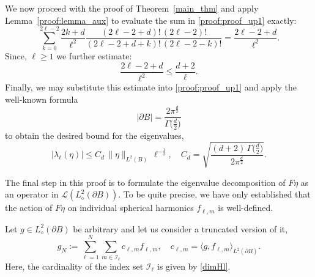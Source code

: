 \documentclass[reqno]{amsart}
\numberwithin{equation}{section}
\numberwithin{figure}{section}
\numberwithin{table}{section}
\theoremstyle{plain}
\theoremstyle{definition}
\theoremstyle{remark}
\newcommand{\abs}[1]{\lvert#1\rvert}
\newcommand{\inner}[1]{\langle#1\rangle}
\newcommand{\sphe}{{\partial B}}
\begin{document}
We now proceed with the proof of Theorem~\ref{main_thm} and apply Lemma~\ref{proof:lemma_aux} to evaluate the sum in \eqref{proof:proof_up1} exactly:
%
\begin{equation} \label{proof:the_sum}
    \sum^{2\ell-2}_{k=0} \frac{2 k+d}{\ell^2} \frac{(2\ell-2+d)! \, (2\ell-2)!}{(2\ell-2+d+k)! \, (2\ell-2-k)!}
    =
    \frac{2 \ell -2 + d}{\ell^2}.
\end{equation}
%
Since, \( \ell \geq 1 \) we further estimate:
%
\begin{equation}
    \frac{2 \ell - 2 + d}{\ell^2} \leq \frac{d+2}{\ell}.
\end{equation}
%
Finally, we may substitute this estimate into \eqref{proof:proof_up1} and apply the well-known formula
%
\[ \abs{\sphe} = \frac{2 \pi^{\frac{d}{2}} }{\Gamma \big( \frac{d}{2} \big)} \]
%
to obtain the desired bound for the eigenvalues,
%
\begin{equation} \label{proof:lambda_bound}
    \abs{\lambda_\ell(\eta)} \leq C_d \, \| \eta \|_{L^2(B)} \, \ell^{-\frac{1}{2}}, \quad C_d = \sqrt{\frac{(d+2) \, \Gamma \big( \frac{d}{2} \big)}{2 \pi^\frac{d}{2}}}.
\end{equation}
%


The final step in this proof is to formulate the eigenvalue decomposition of \( F \eta \) as an operator in \( \mathscr{L}(L^2_\diamond(\sphe)) \).
%
To be quite precise, we have only established that the action of \( F \eta \) on individual spherical harmonics \( f_{\ell, m} \) is well-defined.
%


Let \( g \in L^2_\diamond(\sphe) \) be arbitrary and let us consider a truncated version of it,
%
\[ g_N := \sum^N_{\ell = 1} \sum_{m \in \mathcal{I_\ell}} c_{\ell, m} f_{\ell, m}, \quad c_{\ell, m} = \inner{g, f_{\ell, m}}_{L^2(\sphe)}. \]
%
Here, the cardinality of the index set \( \mathcal{I_\ell} \) is given by \eqref{dimHl}.
%
\end{document}
